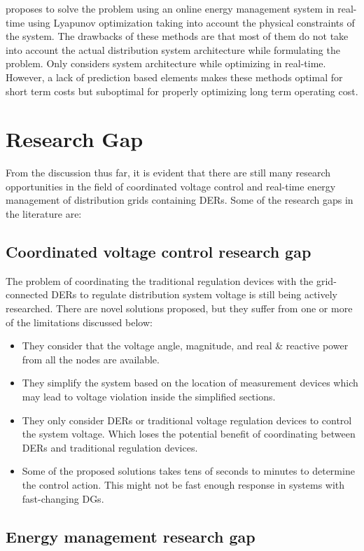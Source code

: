 \cite{Wen17} proposes to solve the problem using an online energy management system in real-time using Lyapunov optimization taking into account the physical constraints of the system.
The drawbacks of these methods are that most of them do not take into account the actual distribution system architecture while formulating the problem. Only \cite{Wen17} considers system architecture while optimizing in real-time. However, a lack of prediction based elements makes these methods optimal for short term costs but suboptimal for properly optimizing long term operating cost.


\section{Research Gap}
From the discussion thus far, it is evident that there are still many research opportunities in the field of coordinated voltage control and real-time energy management of distribution grids containing DERs. Some of the research gaps in the literature are:

\subsection{Coordinated voltage control research gap}
The problem of coordinating the traditional regulation devices with the grid-connected DERs to regulate distribution system voltage is still being actively researched. There are novel solutions proposed, but they suffer from one or more of the limitations discussed below:
\begin{itemize}
    \item They consider that the voltage angle, magnitude, and real \& reactive power from all the nodes are available.
    \item They simplify the system based on the location of measurement devices which may lead to voltage violation inside the simplified sections.
    \item They only consider DERs or traditional voltage regulation devices to control the system voltage. Which loses the potential benefit of coordinating between DERs and traditional regulation devices.
    \item Some of the proposed solutions takes tens of seconds to minutes to determine the control action. This might not be fast enough response in systems with fast-changing DGs.
\end{itemize}

\subsection{Energy management research gap}

